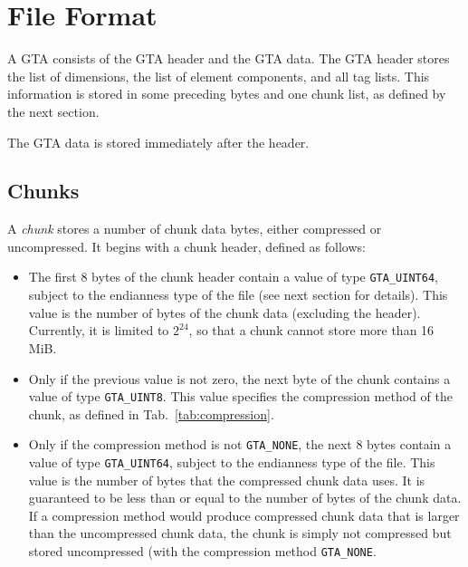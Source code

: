 \documentclass[a4paper,11pt]{article}
\newcommand{\code}[1]{\texttt{#1}}
\begin{document}
\section{File Format}

A GTA consists of the GTA header and the GTA data. The GTA header stores
the list of dimensions, the list of element components, and all tag lists.
This information is stored in some preceding bytes and one chunk list, as
defined by the next section.

The GTA data is stored immediately after the header.

\subsection{Chunks}

A \emph{chunk} stores a number of chunk data bytes, either compressed or uncompressed.
It begins with a chunk header, defined as follows:
\begin{itemize}
\item The first 8 bytes of the chunk header contain a value of type \code{GTA\_UINT64},
subject to the endianness type of the file (see next section for details).
This value is the number of bytes of the chunk data (excluding the
header). Currently, it is limited to $2^24$, so that a chunk cannot store more
than 16 MiB.
\item Only if the previous value is not zero, the next byte of the chunk
contains a value of type \code{GTA\_UINT8}.  This value specifies the
compression method of the chunk, as defined in Tab.~\ref{tab:compression}.
\item Only if the compression method is not \code{GTA\_NONE}, the next 8 bytes
contain a value of type \code{GTA\_UINT64}, subject to the endianness type of
the file. This value is the number of bytes that the compressed chunk data
uses. It is guaranteed to be less than or equal to the number of bytes of the
chunk data. If a compression method would produce compressed chunk data that
is larger than the uncompressed chunk data, the chunk is simply not compressed
but stored uncompressed (with the compression method \code{GTA\_NONE}.
\end{itemize}
\end{document}
